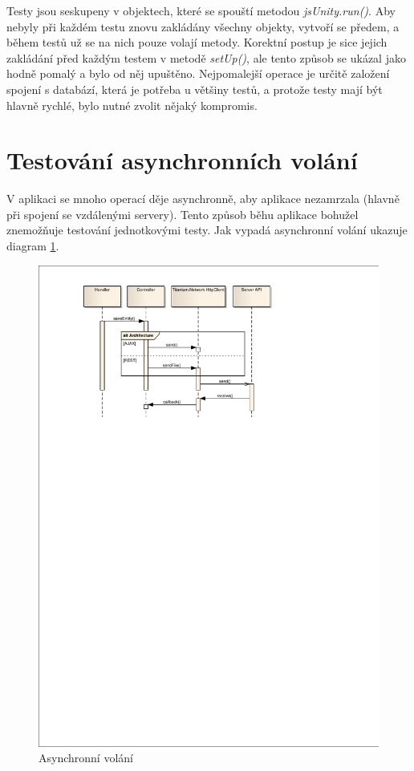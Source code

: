 Testy jsou seskupeny v objektech, které se spouští metodou \emph{jsUnity.run()}. Aby nebyly při každém testu znovu zakládány všechny objekty, vytvoří se předem, a během testů už se na nich pouze volají metody. Korektní postup je sice jejich zakládání před každým testem v metodě \emph{setUp()}, ale tento způsob se ukázal jako hodně pomalý a bylo od něj upuštěno. Nejpomalejší operace je určitě založení spojení s databází, která je potřeba u většiny testů, a protože testy mají být hlavně rychlé, bylo nutné zvolit nějaký kompromis.

\section{Testování asynchronních volání}

V aplikaci se mnoho operací děje asynchronně, aby aplikace nezamrzala (hlavně při spojení se vzdálenými servery). Tento způsob běhu aplikace bohužel znemožňuje testování jednotkovými testy. Jak vypadá asynchronní volání ukazuje diagram \ref{fig:async-tests}.

\begin{figure}[h]
\begin{center}
	\includegraphics[width=15cm,trim=10mm 205mm 40mm 10mm, clip]{figures/async-tests}
	\caption{Asynchronní volání}
	\label{fig:async-tests}
\end{center}
\end{figure}

